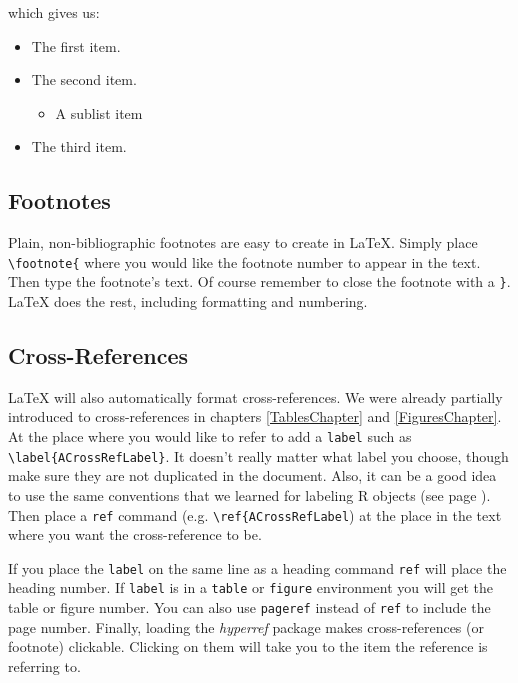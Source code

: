 \noindent which gives us:

\begin{itemize}
    \item The first item.
    \item The second item.
    \begin{itemize}
        \item A sublist item
    \end{itemize}
    \item The third item.
\end{itemize}

\subsection{Footnotes}

Plain, non-bibliographic footnotes are easy to create in LaTeX. Simply place \texttt{\textbackslash{}footnote\{} where you would like the footnote number to appear in the text. Then type the footnote's text. Of course remember to close the footnote with a \texttt{\}}. LaTeX does the rest, including formatting and numbering.

\subsection{Cross-References}

LaTeX will also automatically format cross-references. We were already partially introduced to cross-references in chapters \ref{TablesChapter} and \ref{FiguresChapter}. At the place where you would like to refer to add a \texttt{label} such as \verb|\label{ACrossRefLabel}|. It doesn't really matter what label you choose, though make sure they are not duplicated in the document. Also, it can be a good idea to use the same conventions that we learned for labeling R objects (see page \pageref{ObjectNames}). Then place a \texttt{ref} command (e.g. \verb|\ref{ACrossRefLabel|) at the place in the text where you want the cross-reference to be. 

If you place the \texttt{label} on the same line as a heading command \texttt{ref} will place the heading number. If \texttt{label} is in a \texttt{table} or \texttt{figure} environment you will get the table or figure number. You can also use \texttt{pageref} instead of \texttt{ref} to include the page number. Finally, loading the \emph{hyperref} package makes cross-references (or footnote) clickable. Clicking on them will take you to the item the reference is referring to.

